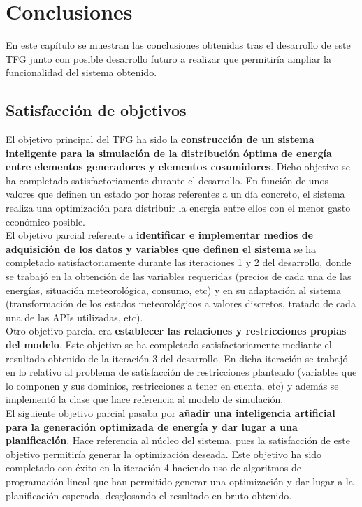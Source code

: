 \chapter{Conclusiones}
\label{cap:Conclusiones}
En este capítulo se muestran las conclusiones obtenidas tras el desarrollo de este \gls{TFG} junto con posible desarrollo futuro a realizar que permitiría ampliar la funcionalidad del sistema obtenido.\\
\section{Satisfacción de objetivos}
El objetivo principal del \gls{TFG} ha sido la \textbf{construcción de un sistema inteligente para la simulación de la distribución óptima de energía entre elementos generadores y elementos cosumidores}. Dicho objetivo se ha completado satisfactoriamente durante el desarrollo. En función de unos valores que definen un estado por horas referentes a un día concreto, el sistema realiza una optimización para distribuir la energia entre ellos con el menor gasto económico posible.\\

El objetivo parcial referente a \textbf{identificar e implementar medios de adquisición de los datos y variables que definen el sistema} se ha completado satisfactoriamente durante las iteraciones 1 y 2 del desarrollo, donde se trabajó en la obtención de las variables requeridas (precios de cada una de las energías, situación meteorológica, consumo, etc) y en su adaptación al sistema (transformación de los estados meteorológicos a valores discretos, tratado de cada una de las APIs utilizadas, etc).\\

Otro objetivo parcial era \textbf{establecer las relaciones y restricciones propias del modelo}. Este objetivo se ha completado satisfactoriamente mediante el resultado obtenido de la iteración 3 del desarrollo. En dicha iteración se trabajó en lo relativo al problema de satisfacción de restricciones planteado (variables que lo componen y sus dominios, restricciones a tener en cuenta, etc) y además se implementó la clase que hace referencia al modelo de simulación.\\

El siguiente objetivo parcial pasaba por \textbf{añadir una inteligencia artificial para la generación optimizada de energía y dar lugar a una planificación}. Hace referencia al núcleo del sistema, pues la satisfacción de este objetivo permitiría generar la optimización deseada. Este objetivo ha sido completado con éxito en la iteración 4 haciendo uso de algoritmos de programación lineal que han permitido generar una optimización y dar lugar a la planificación esperada, desglosando el resultado en bruto obtenido.\\

